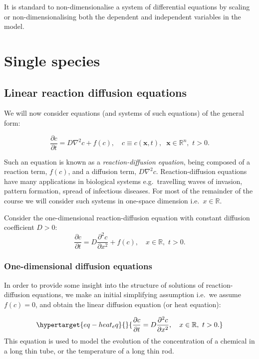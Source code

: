 \documentclass[
  letterpaper,
  DIV=11,
  numbers=noendperiod]{scrreprt}
\theoremstyle{plain}
\theoremstyle{definition}
\theoremstyle{plain}
\theoremstyle{remark}
\begin{document}
It is standard to non-dimensionalise a system of differential equations
by scaling or non-dimensionalising both the dependent and independent
variables in the model.

\part{Single species}

\hypertarget{linear-reaction-diffusion-equations}{%
\chapter{Linear reaction diffusion
equations}\label{linear-reaction-diffusion-equations}}

We will now consider equations (and systems of such equations) of the
general form:

\[
\frac{\partial c}{\partial t} = D \nabla^2 c + f(c), \quad c \equiv c( {\mathbf{x}} , t ), \;\;  {\mathbf{x}} \in \mathbb R^n, \, \, t >0.
\]

Such an equation is known as a \emph{reaction-diffusion equation}, being
composed of a reaction term, \(f(c)\), and a diffusion term,
\(D \nabla^2 c\). Reaction-diffusion equations have many applications in
biological systems e.g.~travelling waves of invasion, pattern formation,
spread of infectious diseases. For most of the remainder of the course
we will consider such systems in one-space dimension
i.e.~\(x \in \mathbb R\).

Consider the one-dimensional reaction-diffusion equation with constant
diffusion coefficient \(D > 0\): \[
\frac{\partial c}{\partial t} = D \frac{\partial^2 c}{\partial x^2}  + f(c), \quad x\in \mathbb R, \, \, t >0.
\]

\hypertarget{one-dimensional-diffusion-equations}{%
\section{One-dimensional diffusion
equations}\label{one-dimensional-diffusion-equations}}

In order to provide some insight into the structure of solutions of
reaction-diffusion equations, we make an initial simplifying assumption
i.e.~we assume \(f(c)=0\), and obtain the linear diffusion equation (or
heat equation):

\begin{equation}\protect\hypertarget{eq-heat_eq}{}{
\frac{\partial c}{\partial t} = D \frac{\partial^2 c}{\partial x^2},   \quad x\in \mathbb R, \, \, t >0.
}\label{eq-heat_eq}\end{equation} This equation is used to model the
evolution of the concentration of a chemical in a long thin tube, or the
temperature of a long thin rod.
\end{document}

